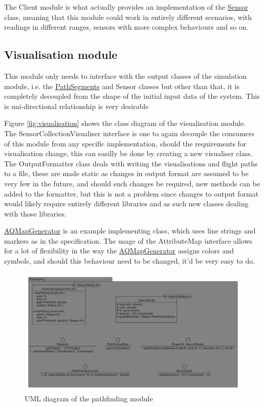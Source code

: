 \documentclass[10pt,a4paper]{article}
\begin{document}
The Client module is what actually provides an implementation of the \hyperref[tab:Sensor]{\color{blue}Sensor} class, meaning that this module could work in entirely different scenarios, with readings in different ranges,
sensors with more complex behaviours and so on.

\subsection{Visualisation module}
This module only needs to interface with the output classes of the simulation module, i.e. the \hyperref[tab:PathSegment]{\color{blue}PathSegments} and Sensor classes but other than that, it is 
completely decoupled from the shape of the initial input data of the system. This is uni-directional relationship is very desirable 
\par
Figure \ref{fig:visualisation} shows the class diagram of the visualisation module.
\\
The SensorCollectionVisualiser interface is one to again decouple the consumers of this module from any specific implementation, should the requirements for visualisation change,
this can easilly be done by creating a new visualiser class. 
The OutputFormatter class deals with writing the visualisations and flight paths to a file, these are made static as changes in output format are assumed to be very few in the future,
and should such changes be required, new methods can be added to the formatter, but this is not a problem since changes to output format would likely require entirely different libraries and as such new classes dealing with those libraries.
\par 
\hyperref[tab:AQMapGenerator]{\color{blue}AQMapGenerator} is an example implementing class, which uses line strings and markers as in the specification.
The usage of the AttributeMap interface allows for a lot of flexibility in the way the \hyperref[tab:AQMapGenerator]{\color{blue}AQMapGenerator} assigns colors and symbols, and should this behaviour need to be changed, it'd be very easy to do.
\begin{figure}[H]
    \centering
    \includegraphics[width=.9\columnwidth]{diagrams/pathfinding.uxf.pdf}
    \caption{UML diagram of the pathfinding module}
    \label{fig:pathfinding}
\end{figure}
\end{document}
